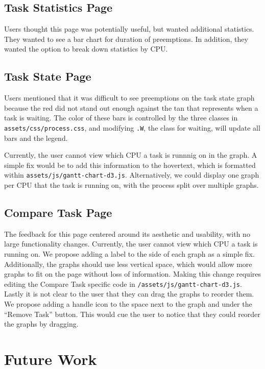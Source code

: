 \documentclass{hmcclinic}
\begin{document}
  \section{Task Statistics Page}

  Users thought this page was potentially useful, but wanted additional
  statistics. They wanted to see a bar chart for duration of preemptions. In
  addition, they wanted the option to break down statistics by CPU.

  \section{Task State Page}

  Users mentioned that it was difficult to see preemptions on the 
  task state graph because the red did not stand out enough against the tan that
  represents when a task is waiting. 
  The color of these bars is controlled by the three classes in 
  \texttt{assets/css/process.css}, and modifying \texttt{.W}, the class for 
  waiting, will update all bars and the legend.

  Currently, the user cannot view which CPU a task is runnnig on in the graph. 
  A simple fix would be to add this information to the hovertext, which is 
  formatted within \texttt{assets/js/gantt-chart-d3.js}. Alternatively, we 
  could display one graph per CPU that the task is running on, with the 
  process split over multiple graphs.

  \section{Compare Task Page}
  The feedback for this page centered around its aesthetic and usability, with no 
  large functionality changes. Currently, the user cannot view which CPU a task 
  is running on. We propose adding a label to the side of each graph as a simple 
  fix. Additionally, the graphs should use less vertical space, which would allow more graphs to fit on the page without loss of 
  information. Making this change requires editing the Compare Task specific 
  code in \texttt{/assets/js/gantt-chart-d3.js}. Lastly it is not clear to the
   user that they can drag the graphs to reorder them. We propose adding a 
   handle icon to the space next to the graph and under the ``Remove Task'' 
   button. This would cue the user to notice that they could reorder the graphs 
   by dragging. 


\chapter{Future Work}
\end{document}
